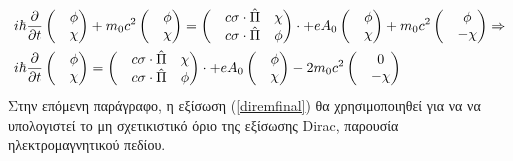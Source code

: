 \begin{align}
  \notag  &i\hbar \frac{\partial }{\partial t} 
  \begin{pmatrix}
    &\phi\\
    &\chi
  \end{pmatrix}
  + m_0c^2  
  \begin{pmatrix}
    &\phi\\
    &\chi
  \end{pmatrix} 
   = 
  \begin{pmatrix}
    &c \sigma \cdot \hat{\Pi}  &\chi \\
    &c \sigma \cdot \hat{\Pi}  &\phi
  \end{pmatrix} 
  \cdot 
  + e A_0
  \begin{pmatrix}
    &\phi\\
    &\chi
  \end{pmatrix}
  +m_0 c^2 
  \begin{pmatrix}
    &\phi\\
    &-\chi
  \end{pmatrix}\Rightarrow\\
  &i\hbar \frac{\partial }{\partial t} 
  \begin{pmatrix}
    &\phi\\
    &\chi
  \end{pmatrix}
    = 
  \begin{pmatrix}
    &c \sigma \cdot \hat{\Pi}  &\chi \\
    &c \sigma \cdot \hat{\Pi}  &\phi
  \end{pmatrix} 
  \cdot 
  + e A_0
  \begin{pmatrix}
    &\phi\\
    &\chi
  \end{pmatrix}
  -2m_0 c^2 
  \begin{pmatrix}
    &0\\
    &-\chi
  \end{pmatrix}
  \label{diremfinal} 
\end{align}
Στην επόμενη παράγραφο, η εξίσωση (\ref{diremfinal}) θα χρησιμοποιηθεί για να να υπολογιστεί το μη σχετικιστικό όριο της εξίσωσης \textlatin{Dirac}, παρουσία ηλεκτρομαγνητικού πεδίου. 
\pagebreak
